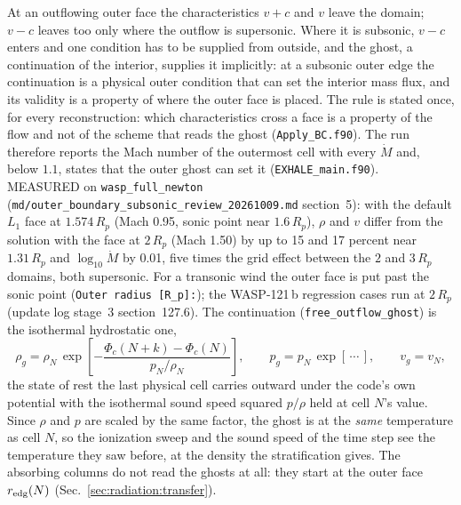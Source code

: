 At an outflowing outer face the characteristics $v+c$ and $v$ leave the
domain; $v-c$ leaves too only where the outflow is supersonic.  Where it is
subsonic, $v-c$ enters and one condition has to be supplied from outside, and
the ghost, a continuation of the interior, supplies it implicitly: at a
subsonic outer edge the continuation is a physical outer condition that can
set the interior mass flux, and its validity is a property of where the outer
face is placed.  The rule is stated once, for every reconstruction: which
characteristics cross a face is a property of the flow and not of the scheme
that reads the ghost (\texttt{Apply\_BC.f90}).
The run therefore reports the Mach number of the outermost cell with every
$\dot M$ and, below $1.1$, states that the outer ghost can set it
(\texttt{EXHALE\_main.f90}).  MEASURED on \texttt{wasp\_full\_newton}
(\texttt{md/outer\_boundary\_subsonic\_review\_20261009.md} section~5): with
the default $L_1$ face at $1.574\,R_p$ (Mach 0.95, sonic point near
$1.6\,R_p$), $\rho$ and $v$ differ from the solution with the face at
$2\,R_p$ (Mach 1.50) by up to 15 and 17 percent near $1.31\,R_p$ and
$\log_{10}\dot M$ by 0.01, five times the grid effect between the $2$ and
$3\,R_p$ domains, both supersonic.  For a transonic wind the outer face is
put past the sonic point (\texttt{Outer radius [R\_p]:}); the WASP-121\,b
regression cases run at $2\,R_p$ (update log stage~3 section~127.6).
The continuation (\texttt{free\_outflow\_ghost}) is the isothermal hydrostatic
one,
%
\begin{equation}
  \rho_g = \rho_N\,\exp\!\left[-\frac{\Phi_c(N{+}k) - \Phi_c(N)}{p_N/\rho_N}\right],
  \qquad
  p_g = p_N\,\exp[\,\cdots\,],
  \qquad
  v_g = v_N,
  \label{eq:outflow_ghost}
\end{equation}
%
the state of rest the last physical cell carries outward under the code's own
potential with the isothermal sound speed squared $p/\rho$ held at cell $N$'s
value.  Since $\rho$ and $p$ are scaled by the same factor, the ghost is at the
\emph{same} temperature as cell $N$, so the ionization sweep and the sound
speed of the time step see the temperature they saw before, at the density
the stratification gives.  The absorbing columns do not read the ghosts at
all: they start at the outer face $r_{\rm edg}(N)$
(Sec.~\ref{sec:radiation:transfer}).

